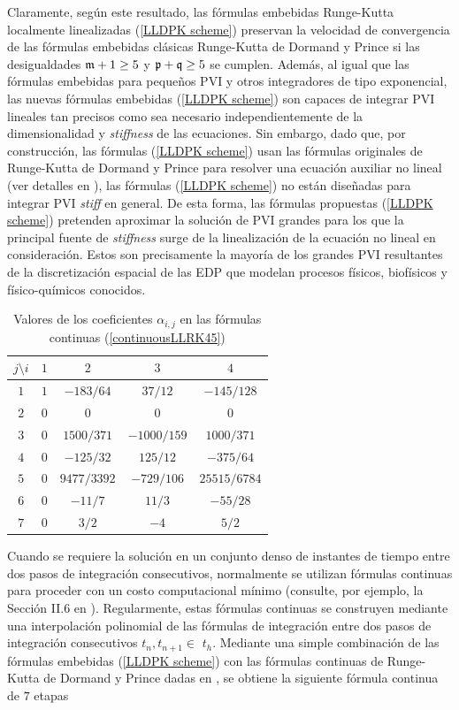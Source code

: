 Claramente, según este resultado, las fórmulas embebidas Runge-Kutta localmente linealizadas (\ref{LLDPK scheme}) preservan la velocidad de convergencia de las fórmulas embebidas clásicas Runge-Kutta de Dormand y Prince si las desigualdades $\mathfrak{m}+1 \ge 5 $ y $\mathfrak{p}+\mathfrak{q} \ge 5$ se cumplen. Además, al igual que las fórmulas embebidas para pequeños PVI y otros integradores de tipo exponencial, las nuevas fórmulas embebidas (\ref{LLDPK scheme}) son capaces de integrar PVI lineales tan precisos como sea necesario independientemente de la dimensionalidad y \textit{stiffness} de las ecuaciones. Sin embargo, dado que, por construcción, las fórmulas (\ref{LLDPK scheme}) usan las fórmulas originales de Runge-Kutta de Dormand y Prince para resolver una ecuación auxiliar no lineal (ver detalles en \cite{Jimenez13, Jimenez14AMC}), las fórmulas (\ref{LLDPK scheme}) no están diseñadas para integrar PVI \textit{stiff} en general. De esta forma, las fórmulas propuestas (\ref{LLDPK scheme}) pretenden aproximar la solución de PVI grandes para los que la principal fuente de \textit{stiffness} surge de la linealización de la ecuación no lineal en consideración. Estos son precisamente la mayoría de los grandes PVI resultantes de la discretización espacial de las EDP que modelan procesos físicos, biofísicos y físico-químicos conocidos.
\begin{table}[h]
	\caption{ Valores de los coeficientes $\alpha _{i,j}$ en las fórmulas continuas (\ref{continuousLLRK45}) \newline \label{Table continuous RK}}
	\centering
	\begin{tabular}{ccccc}
		\hline
		$j\setminus i$ & $1$ & $2$ & $3$ & $4$ \\
		\hline
		$1$ & $1$ & $-183/64$ & $37/12$ & $-145/128$ \\
		$2$ & $0$ & $0$ & $0$ & $0$ \\
		$3$ & $0$ & $1500/371$ & $-1000/159$ & $1000/371$ \\
		$4$ & $0$ & $-125/32$ & $125/12$ & $-375/64$ \\
		$5$ & $0$ &	$9477/3392$ & $-729/106$ & $25515/6784$ \\
		$6$ & $0$ &	$-11/7$ & $11/3$ & $-55/28$ \\
		$7$ & $0$ & $3/2$ & $-4$ & $5/2$ \\
		\hline
	\end{tabular}
\end{table}
Cuando se requiere la solución en un conjunto denso de instantes de tiempo entre dos pasos de integración consecutivos, normalmente se utilizan fórmulas continuas para proceder con un costo computacional mínimo (consulte, por ejemplo, la Sección II.6 en \cite{hairer1993solving}). Regularmente, estas fórmulas continuas se construyen mediante una interpolación polinomial de las fórmulas de integración entre dos pasos de integración consecutivos $t_{n},t_{n+1}\in $ $ t_{h}$. Mediante una simple combinación de las fórmulas embebidas (\ref{LLDPK scheme}) con las fórmulas continuas de Runge-Kutta de Dormand y Prince dadas en \cite{hairer1993solving}, se obtiene la siguiente fórmula continua de $7$ etapas
